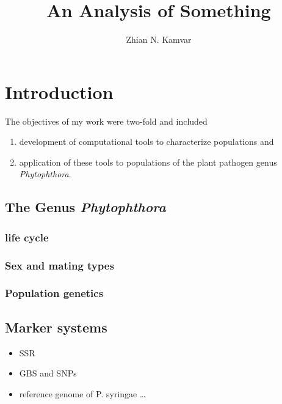 \documentclass[double,12pt]{beavtex}
\title{An Analysis of Something} %
\author{Zhian N. Kamvar} %
\providecommand{\tightlist}{%
  \setlength{\itemsep}{0pt}\setlength{\parskip}{0pt}}
\begin{document}
\maketitle
\mainmatter


  \chapter{Introduction}\label{introduction}
  
  The objectives of my work were two-fold and included
  
  \begin{enumerate}
  \def\labelenumi{\arabic{enumi}.}
  \tightlist
  \item
    development of computational tools to characterize populations and
  \item
    application of these tools to populations of the plant pathogen genus
    \emph{Phytophthora}.
  \end{enumerate}
  
  \section{\texorpdfstring{The Genus
  \emph{Phytophthora}}{The Genus Phytophthora}}\label{the-genus-phytophthora}
  
  \subsection{life cycle}\label{life-cycle}
  
  \subsection{Sex and mating types}\label{sex-and-mating-types}
  
  \subsection{Population genetics}\label{population-genetics}
  
  \section{Marker systems}\label{marker-systems}
  
  \begin{itemize}
  \tightlist
  \item
    SSR
  \item
    GBS and SNPs
  \item
    reference genome of P. syringae \ldots{} 
  \end{itemize}
  
\end{document}
